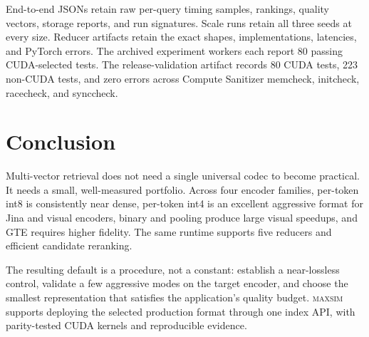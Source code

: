 \documentclass{article}
\newcommand{\sysname}{\textsc{maxsim}}
\begin{document}
End-to-end JSONs retain raw per-query timing samples, rankings, quality
vectors, storage reports, and run signatures. Scale runs retain all three
seeds at every size. Reducer artifacts retain the exact shapes, implementations,
latencies, and PyTorch errors. The archived experiment workers each report 80
passing CUDA-selected tests. The release-validation artifact records 80 CUDA
tests, 223 non-CUDA tests, and zero errors across Compute Sanitizer memcheck,
initcheck, racecheck, and synccheck.

\section{Conclusion}

Multi-vector retrieval does not need a single universal codec to become
practical. It needs a small, well-measured portfolio. Across four encoder
families, per-token int8 is consistently near dense, per-token int4 is an
excellent aggressive format for Jina and visual encoders, binary and pooling
produce large visual speedups, and GTE requires higher fidelity. The same
runtime supports five reducers and efficient candidate reranking.

The resulting default is a procedure, not a constant: establish a
near-lossless control, validate a few aggressive modes on the target encoder,
and choose the smallest representation that satisfies the application's
quality budget. \sysname{} supports deploying the selected production format
through one index API, with parity-tested CUDA kernels and reproducible
evidence.
\end{document}
